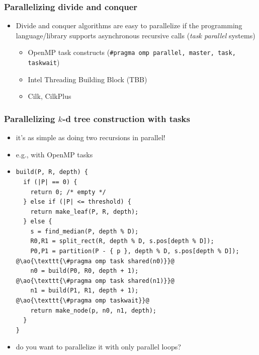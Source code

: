 \documentclass[12pt,dvipdfmx]{beamer}
\newcommand{\ao}[1]{{\color{blue}#1}}
\newcommand{\aka}[1]{{\color{red}#1}}
\begin{document}
\begin{frame}
\frametitle{Parallelizing divide and conquer}
\begin{itemize}
\item Divide and conquer algorithms are easy to
  parallelize if the programming language/library
  supports asynchronous recursive calls 
  (\aka{\em task parallel\/} systems)
  \begin{itemize}
  \item OpenMP task constructs ({\tt \#pragma omp parallel, master, task, taskwait})
  \item Intel Threading Building Block (TBB)
  \item Cilk, CilkPlus
  \end{itemize}

\end{itemize}

\begin{center}
\end{center}
\end{frame}

\begin{frame}[fragile]
\frametitle{Parallelizing $k$-d tree construction with tasks}
\begin{itemize}
\item it's as simple as doing two recursions in parallel!
\item e.g., with OpenMP tasks
\item []
\begin{lstlisting}
build(P, R, depth) {
  if (|P| == 0) {
    return 0; /* empty */
  } else if (|P| <= threshold) {
    return make_leaf(P, R, depth);
  } else {
    s = find_median(P, depth % D);
    R0,R1 = split_rect(R, depth % D, s.pos[depth % D]);
    P0,P1 = partition(P - { p }, depth % D, s.pos[depth % D]);
@\ao{\texttt{\#pragma omp task shared(n0)}}@
    n0 = build(P0, R0, depth + 1);
@\ao{\texttt{\#pragma omp task shared(n1)}}@
    n1 = build(P1, R1, depth + 1);
@\ao{\texttt{\#pragma omp taskwait}}@
    return make_node(p, n0, n1, depth);
  }
}
\end{lstlisting}
\item do you want to parallelize it with only parallel loops?
\end{itemize}
\end{frame}
\end{document}
